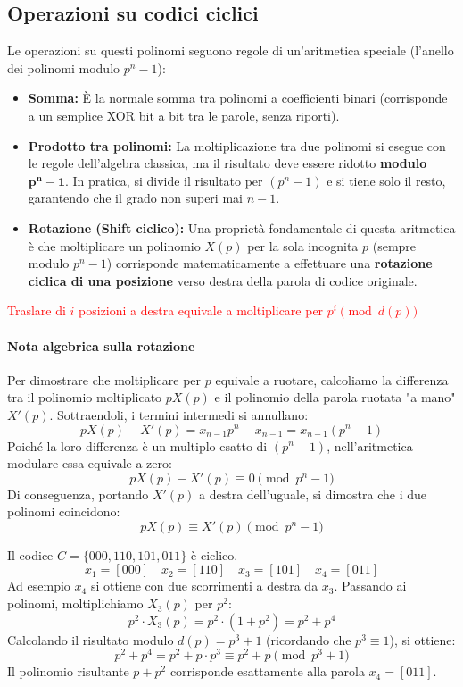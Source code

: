 \subsection{Operazioni su codici ciclici}
Le operazioni su questi polinomi seguono regole di un'aritmetica speciale (l'anello dei polinomi modulo $p^n-1$):
\begin{itemize}
    \item \textbf{Somma:} È la normale somma tra polinomi a coefficienti binari (corrisponde a un semplice XOR bit a bit tra le parole, senza riporti).
    \item \textbf{Prodotto tra polinomi:} La moltiplicazione tra due polinomi si esegue con le regole dell'algebra classica, ma il risultato deve essere ridotto \textbf{modulo $\boldsymbol{p^n - 1}$}. In pratica, si divide il risultato per $(p^n - 1)$ e si tiene solo il resto, garantendo che il grado non superi mai $n-1$.
    \item \textbf{Rotazione (Shift ciclico):} Una proprietà fondamentale di questa aritmetica è che moltiplicare un polinomio $X(p)$ per la sola incognita $p$ (sempre modulo $p^n-1$) corrisponde matematicamente a effettuare una \textbf{rotazione ciclica di una posizione} verso destra della parola di codice originale.
\end{itemize}
\textcolor{red}{Traslare di $i$ posizioni a destra equivale a moltiplicare per $p^i \pmod{d(p)}$}
\paragraph{Nota algebrica sulla rotazione}
Per dimostrare che moltiplicare per $p$ equivale a ruotare, calcoliamo la differenza tra il polinomio moltiplicato $pX(p)$ e il polinomio della parola ruotata "a mano" $X'(p)$. Sottraendoli, i termini intermedi si annullano:
\[ pX(p) - X'(p) = x_{n-1}p^n - x_{n-1} = x_{n-1}(p^n - 1) \]
Poiché la loro differenza è un multiplo esatto di $(p^n - 1)$, nell'aritmetica modulare essa equivale a zero:
\[ pX(p) - X'(p) \equiv 0 \pmod{p^n - 1} \]
Di conseguenza, portando $X'(p)$ a destra dell'uguale, si dimostra che i due polinomi coincidono:
\[ pX(p) \equiv X'(p) \pmod{p^n - 1} \]

\begin{esempio}
    Il codice $C=\{000,110,101,011\}$ è ciclico.
    \[x_1 = [000]\quad x_2 = [110] \quad x_3 = [101]\quad x_4 = [011]\]
Ad esempio $x_4$ si ottiene con due scorrimenti a destra da $x_3$. Passando ai polinomi, moltiplichiamo $X_3(p)$ per $p^2$:
    \[ p^2 \cdot X_3(p) = p^2 \cdot (1+p^2) = p^2+p^4 \]
    Calcolando il risultato modulo $d(p)=p^3+1$ (ricordando che $p^3 \equiv 1$), si ottiene:
    \[ p^2 + p^4 = p^2 + p \cdot p^3 \equiv p^2 + p \pmod{p^3+1} \]
    Il polinomio risultante $p+p^2$ corrisponde esattamente alla parola $x_4 = [011]$.
\end{esempio}

